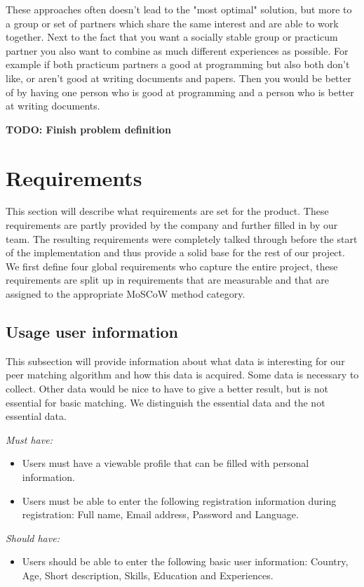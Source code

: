 \documentclass[]{article}
\newcommand{\TODO}[1]{{\color{red}\textbf{TODO: #1}}}
\newcommand{\reqr}[1]{{\noindent\emph{#1:}}}
\begin{document}
These approaches often doesn't lead to the "most optimal" solution, but more to a group or set of partners which share the same interest and are able to work together.
Next to the fact that you want a socially stable group or practicum partner you also want to combine as much different experiences as possible.
For example if both practicum partners a good at programming but also both don't like, or aren't good at writing documents and papers.
Then you would be better of by having one person who is good at programming and a person who is better at writing documents.

\TODO{Finish problem definition}

\section{Requirements}
This section will describe what requirements are set for the product.
These requirements are partly provided by the company and further filled in by our team.
The resulting requirements were completely talked through before the start of the implementation and thus provide a solid base for the rest of our project.
We first define four global requirements who capture the entire project, these requirements are split up in requirements that are measurable and that are assigned to the appropriate MoSCoW\cite{highsmith2001agile} method category.

\subsection{Usage user information}
This subsection will provide information about what data is interesting for our peer matching algorithm and how this data is acquired.
Some data is necessary to collect. 
Other data would be nice to have to give a better result, but is not essential for basic matching.
We distinguish the essential data and the not essential data.\cite{cmu}

\reqr{Must have}
\begin{itemize}
\item Users must have a viewable profile that can be filled with personal information.
\item Users must be able to enter the following registration information during registration: Full name, Email address, Password and Language.
\end{itemize}

\reqr{Should have}
\begin{itemize}
\item Users should be able to enter the following basic user information: Country, Age, Short description, Skills, Education and Experiences.
\end{itemize}
\end{document}
